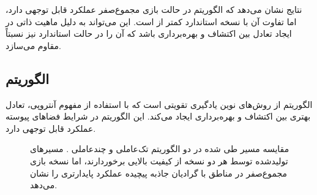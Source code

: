 نتایج نشان می‌دهد که الگوریتم  در حالت بازی مجموع‌صفر عملکرد قابل توجهی دارد، اما تفاوت آن با نسخه استاندارد کمتر از  است. این می‌تواند به دلیل ماهیت ذاتی  در ایجاد تعادل بین اکتشاف و بهره‌برداری باشد که آن را در حالت استاندارد نیز نسبتاً مقاوم می‌سازد.

\subsection{الگوریتم }

الگوریتم   از روش‌های نوین یادگیری تقویتی است که با استفاده از مفهوم آنتروپی، تعادل بهتری بین اکتشاف و بهره‌برداری ایجاد می‌کند. این الگوریتم در شرایط فضاهای پیوسته عملکرد قابل توجهی دارد.

\begin{figure}[H]
	\centering
	
	
	\caption{
		مقایسه مسیر طی شده در دو الگوریتم تک‌عاملی و چندعاملی .
		مسیرهای تولیدشده توسط هر دو نسخه از کیفیت بالایی برخوردارند، اما نسخه بازی مجموع‌صفر در مناطق با گرادیان جاذبه پیچیده عملکرد پایدارتری را نشان می‌دهد.
	}
\end{figure}


